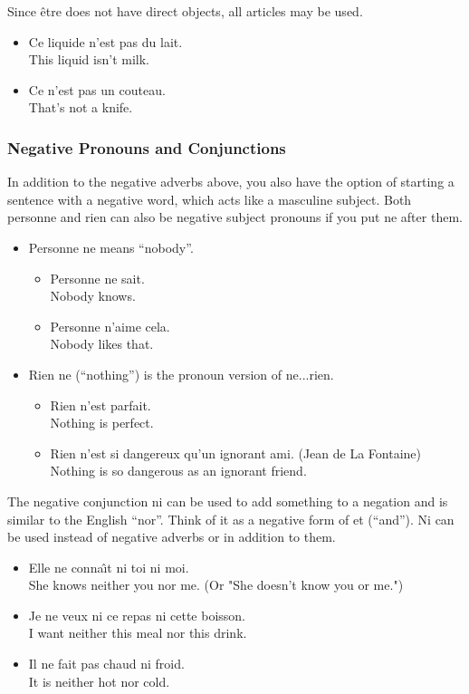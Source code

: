 Since {\^e}tre does not have direct objects, all articles may be used.

\begin{itemize}
  \item  Ce liquide n'est pas du lait. \\ This liquid isn't milk.
  \item  Ce n'est pas un couteau. \\ That's not a knife.
\end{itemize}

\subsubsection{Negative Pronouns and Conjunctions}

In addition to the negative adverbs above, you also have the option of starting a sentence with a negative word, which acts like a masculine subject. Both personne and rien can also be negative subject pronouns if you put ne after them.

\begin{itemize}
  \item  Personne ne means ``nobody''.
    \begin{itemize}
      \item  Personne ne sait. \\ Nobody knows.
      \item  Personne n'aime cela. \\ Nobody likes that.
    \end{itemize}
  \item  Rien ne (``nothing'') is the pronoun version of ne...rien.
    \begin{itemize}
      \item  Rien n'est parfait. \\ Nothing is perfect.
      \item  Rien n'est si dangereux qu'un ignorant ami. (Jean de La Fontaine) \\ Nothing is so dangerous as an ignorant friend.
    \end{itemize}
\end{itemize}

The negative conjunction ni can be used to add something to a negation and is similar to the English ``nor''. Think of it as a negative form of et (``and''). Ni can be used instead of negative adverbs or in addition to them.

\begin{itemize}
  \item  Elle ne conna{\^{\i}}t ni toi ni moi. \\ She knows neither you nor me. (Or "She doesn't know you or me.")
  \item  Je ne veux ni ce repas ni cette boisson. \\ I want neither this meal nor this drink.
  \item  Il ne fait pas chaud ni froid. \\ It is neither hot nor cold.
\end{itemize}

